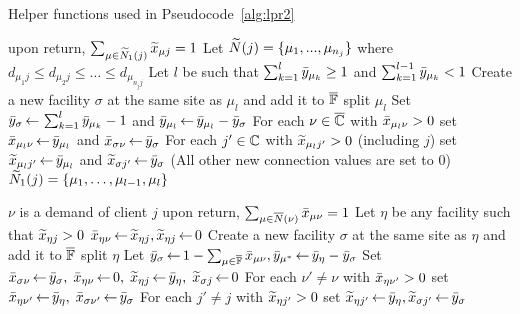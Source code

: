 \documentclass[11pt]{article}
\begin{document}
\begin{algorithm}[ht]
  \caption{Helper functions used in Pseudocode~\ref{alg:lpr2}}
  \label{alg:helper}
  \begin{algorithmic}[1]
						\Comment upon return, $\sum_{\mu\in{\widetilde N}_1(j)} {\widetilde x}_{\mu j} = 1$
    \State Let ${\widetilde N}(j) = \{\mu_1,...,\mu_{n_j}\}$ where $d_{\mu_1 j} \leq d_{\mu_2 j} \leq \ldots \leq d_{\mu_{n_j j}}$
    \State Let $l$ be such that $\sum_{k=1}^{l} {\bar y}_{\mu_k} \geq 1$ and $\sum_{k=1}^{l -1} {\bar y}_{\mu_{k}} < 1$
    \State Create a new facility $\sigma$ at the same site as $\mu_l$ and add it to $\overline{\mathbb{F}}$
			\Comment split $\mu_l$
    \State Set ${\bar y}_{\sigma}{\,\leftarrow\,} \sum_{k=1}^{l} {\bar y}_{\mu_{k}}-1$
					and ${\bar y}_{\mu_l} {\,\leftarrow\,} {\bar y}_{\mu_l} - {\bar y}_{\sigma}$
    \State For each $\nu\in\overline{\mathbb{C}}$ with ${\bar x}_{\mu_{l}\nu}>0$
 			set ${\bar x}_{\mu_{l}\nu} {\,\leftarrow\,} {\bar y}_{\mu_l}$ and ${\bar x}_{\sigma \nu} {\,\leftarrow\,} {\bar y}_{\sigma}$
    \State For each $j'\in\mathbb{C}$ with ${\widetilde x}_{\mu_{l} j'}>0$ (including $j$)
			set ${\widetilde x}_{\mu_l j'} {\,\leftarrow\,} {\bar y}_{\mu_l}$ and ${\widetilde x}_{\sigma j'} {\,\leftarrow\,} {\bar y}_\sigma$
	\State (All other new connection values are set to $0$)
    \State \Return ${\widetilde N}_1(j) = \{\mu_{1},\ldots,\mu_{l-1}, \mu_{l}\}$    				
    \EndFunction

    					\Comment $\nu$ is a demand of client $j$
    					\Comment upon return, $\sum_{\mu\in{\overline{N}}(\nu)} {\bar x}_{\mu\nu} = 1$
    \State Let $\eta$ be any facility such that ${\widetilde x}_{\eta j} > 0$
    \State ${\bar x}_{\eta\nu} {\,\leftarrow\,} {\widetilde x}_{\eta j}, {\widetilde x}_{\eta j} {\,\leftarrow\,} 0$
    \Else
    \State Create a new facility $\sigma$ at the same site as $\eta$ and add it to $\overline{\mathbb{F}}$
    					\Comment split $\eta$
    \State Let ${\bar y}_\sigma {\,\leftarrow\,} 1-\sum_{\mu\in \overline{\mathbb{F}}} {\bar x}_{\mu\nu}, {\bar y}_{\mu^\ast} {\,\leftarrow\,} {\bar y}_{\eta} - {\bar y}_{\sigma}$
    \State Set ${\bar x}_{\sigma\nu}{\,\leftarrow\,} {\bar y}_{\sigma},\; {\bar x}_{\eta \nu} {\,\leftarrow\,}  0,\; {\widetilde x}_{\eta j} {\,\leftarrow\,} {\bar y}_{\eta}, \; {\widetilde x}_{\sigma j} {\,\leftarrow\,} 0$
    \State For each $\nu' \neq \nu$ with ${\bar x}_{\eta \nu'}>0$ set ${\bar x}_{\eta \nu'} {\,\leftarrow\,} {\bar y}_{\eta},\; {\bar x}_{\sigma \nu'} {\,\leftarrow\,} {\bar y}_{\sigma}$
    \State For each $j' \neq j$ with ${\widetilde x}_{\eta j'}>0$ set ${\widetilde x}_{\eta j'} {\,\leftarrow\,} {\bar y}_{\eta}, {\widetilde x}_{\sigma j'} {\,\leftarrow\,} {\bar y}_{\sigma}$
    \EndIf
    \EndWhile
    \EndFunction
  \end{algorithmic}
\end{algorithm}
\end{document}
